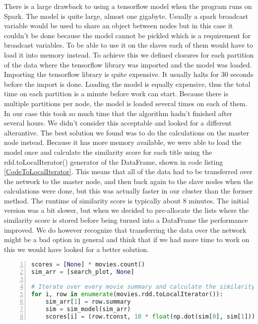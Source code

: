 There is a large drawback to using a tensorflow model when the program runs on Spark. The model is quite large, almost one gigabyte. Usually a spark broadcast variable would be used to share an object between nodes but in this case it couldn’t be done because the model cannot be pickled which is a requirement for broadcast variables. To be able to use it on the slaves each of them would have to load it into memory instead. To achieve this we defined closures for each partition of the data where the tensorflow library was imported and the model was loaded. Importing the tensorflow library is quite expensive. It usually halts for 30 seconds before the import is done. Loading the model is equally expensive, thus the total time on each partition is a minute before work can start. Because there is multiple partitions per node, the model is loaded several times on each of them. In our case this took so much time that the algorithm hadn’t finished after several hours. We didn’t consider this acceptable and looked for a different alterantive. The best solution we found was to do the calculations on the master node instead. Because it has more memory available, we were able to load the model once and calculate the similarity score for each title using the rdd.toLocalIterator() generator of the DataFrame, shown in code listing \ref{CodeToLocalIterator}. This means that all of the data had to be transferred over the network to the master node, and then back again to the slave nodes when the calculations were done, but this was actually faster in our cluster than the former method. The runtime of similarity score is typically about 8 minutes. The initial version was a bit slower, but when we decided to pre-allocate the lists where the similarity score is stored before being turned into a DataFrame the performance improved. We do however recognize that transferring the data over the network might be a bad option in general and think that if we had more time to work on this we would have looked for a better solution.



\begin{lstlisting}[float=h, language=Python, caption=Plot similarity, label=CodeToLocalIterator, numbers=left]
scores = [None] * movies.count()
sim_arr = [search_plot, None]

# Iterate over every movie summary and calculate the similarity score
for i, row in enumerate(movies.rdd.toLocalIterator()):
    sim_arr[1] = row.summary
    sim = sim_model(sim_arr)
    scores[i] = (row.tconst, 10 * float(np.dot(sim[0], sim[1])))
\end{lstlisting}



